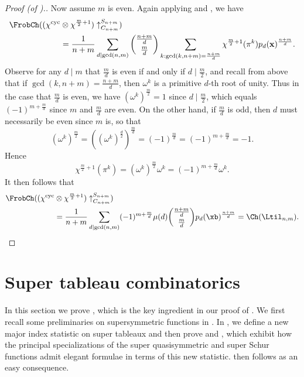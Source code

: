 \begin{proof}[Proof (of ).]
Now assume $m$ is even. Again applying  and , we have
\begin{align*}
\FrobCh((\chi^\mathrm{cyc} &\otimes \chi^{\frac{m}{2}+1})\uparrow_{C_{n+m}}^{S_{n+m}}) \\
&= \frac{1}{n+m} \sum_{d \mid \gcd(n,m)} \binom{\frac{n+m}{d}}{\frac{m}{d}} \sum_{k : \gcd(k,n+m) = \frac{n+m}{d}} \chi^{\frac{m}{2}+1}(\pi^k) p_d(\mathbf{x})^{\frac{n+m}{d}}.
\end{align*}
Observe for any $d \mid m$ that $\frac{m}{d}$ is even if and only if $d \mid \frac{m}{2}$, and recall from above that if $\gcd(k,n+m) = \frac{n+m}{d}$, then $\omega^k$ is a primitive $d$-th root of unity. Thus in the case that $\frac{m}{d}$ is even, we have $(\omega^k)^{\frac{m}{2}} = 1$ since $d \mid \frac{m}{2}$, which equals $(-1)^{m+\frac{m}{d}}$ since $m$ and $\frac{m}{d}$ are even. On the other hand, if $\frac{m}{d}$ is odd, then $d$ must necessarily be even since $m$ is, so that
\[
(\omega^k)^{\frac{m}{2}} = ((\omega^k)^{\frac{d}{2}})^{\frac{m}{d}} = (-1)^{\frac{m}{d}} = (-1)^{m + \frac{m}{d}} = -1.
\]
Hence
\[
\chi^{\frac{m}{2}+1}(\pi^k) = (\omega^k)^{\frac{m}{2}}\omega^k = (-1)^{m+\frac{m}{d}}\omega^k.
\]
It then follows that
\begin{align*}
\FrobCh((\chi^\mathrm{cyc} &\otimes \chi^{\frac{m}{2}+1})\uparrow_{C_{n+m}}^{S_{n+m}}) \\
&= \frac{1}{n+m} \sum_{d \mid \gcd(n,m)} (-1)^{m + \frac{m}{d}} \mu(d) \binom{\frac{n+m}{d}}{\frac{m}{d}} p_d(\xb)^\frac{n+m}{d} = \Ch(\Ltil_{n,m}). \qedhere
\end{align*}
\end{proof}

\section{Super tableau combinatorics}\label{sec:super-tab}
In this section we prove , which is the key ingredient in our proof of . We first recall some preliminaries on supersymmetric functions in . In , we define a new major index statistic on super tableaux and then prove  and , which exhibit how the principal specializations of the super quasisymmetric and super Schur functions admit elegant formulae in terms of this new statistic.  then follows as an easy consequence.

